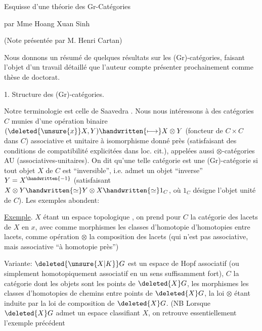 
Esquisse d'une théorie des Gr-Catégories

par Mme Hoang Xuan Sinh

(Note présentée par M. Henri Cartan)

Nous donnons un résumé de quelques résultats sur les (Gr)-catégories, faisant l'objet d'un travail détaillé que l'auteur compte présenter prochainement comme thèse de doctorat\handwritten{[~]}.

1. Structure des (Gr)-catégories.

Notre terminologie est celle de Saavedra \handwritten{[~]}. Nous nous intéressons à des catégories $C$ munies d'une opération binaire $(\deleted{\unsure{x}}X,Y)\handwritten{\longmapsto}X\otimes Y$ (foncteur de $C\times C$ dans $C$) associative et unitaire à isomorphisme donné près (satisfaisant des conditions de compatibilité explicitées dans loc. cit.), appelées aussi $\otimes$-catégories AU (associatives-unitaires). On dit qu'une telle catégorie est une (Gr)-catégorie si  tout objet $X$ de $C$ est ``inversible'', i.e. admet un objet ``inverse'' $Y=X^{\handwritten{-1}}$ (satisfaisant $X\otimes Y\handwritten{\simeq}Y\otimes X\handwritten{\simeq}1_C$, où $1_C$ désigne l'objet unité de $C$). Les exemples abondent:

\uline{Exemple}. $X$ étant un espace topologique , on prend pour $C$ la catégorie des lacets de $X$ en $x$, avec comme morphismes les classes d'homotopie d'homotopies entre lacets, comme opération $\otimes$ la composition des lacets (qui n'est pas associative, mais associative ``à homotopie près'')


Variante: $\deleted{\unsure{X|K}}G$ est un espace de Hopf associatif (ou simplement homotopiquement associatif en un sens suffisamment fort), $C$ la catégorie dont les objets sont les points de $\deleted{X}G$, les morphismes les classes d'homotopies de chemins entre points de $\deleted{X}G$, la loi $\otimes$ étant induite par la loi de composition de $\deleted{X}G$. (NB Lorsque $\deleted{X}G$ admet un espace classifiant $X$, on retrouve essentiellement l'exemple précédent

